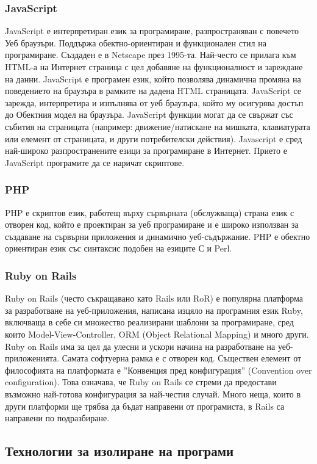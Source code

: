 \documentclass[pdftex,14pt,a4paper]{extreport}
\begin{document}
\subsubsection {JavaScript}
JavaScript е интерпретиран език за програмиране, разпространяван с повечето Уеб браузъри. Поддържа обектно-ориентиран и функционален стил на програмиране. Създаден е в Netscape през 1995-та. Най-често се прилага към HTML-а на Интернет страница с цел добавяне на функционалност и зареждане на данни. JavaScript е програмен език, който позволява динамична промяна на поведението на браузъра в рамките на дадена HTML страницата. JavaScript се зарежда, интерпретира и изпълнява от уеб браузъра, който му осигурява достъп до Обектния модел на браузъра. JavaScript функции могат да се свържат със събития на страницата (например: движение/натискане на мишката, клавиатурата или елемент от страницата, и други потребителски действия). Javascript е сред най-широко разпространените езици за програмиране в Интернет. Прието е JavaScript програмите да се наричат скриптове.
\subsubsection {PHP}
PHP е скриптов език, работещ върху сървърната (обслужваща) страна език с отворен код, който е проектиран за уеб програмиране и е широко използван за създаване на сървърни приложения и динамично уеб-съдържание. PHP е обектно ориентиран език със синтаксис подобен на езиците С и Perl.
\subsubsection {Ruby on Rails}
Ruby on Rails (често съкращавано като Rails или RoR) е популярна платформа за разработване на уеб-приложения, написана изцяло на програмния език Ruby, включваща в себе си множество реализирани шаблони за програмиране, сред които Model-View-Controller, ORM (Object Relational Mapping) и много други. Ruby on Rails има за цел да улесни и ускори начина на разработване на уеб-приложенията. Самата софтуерна рамка е с отворен код. Съществен елемент от философията на платформата е ''Конвенция пред конфигурация'' (Convention over configuration). Това означава, че Ruby on Rails се стреми да предостави възможно най-готова конфигурация за най-честия случай. Много неща, които в други платформи ще трябва да бъдат направени от програмиста, в Rails са направени по подразбиране.
\subsection {Технологии за изолиране на програми}
\end{document}
